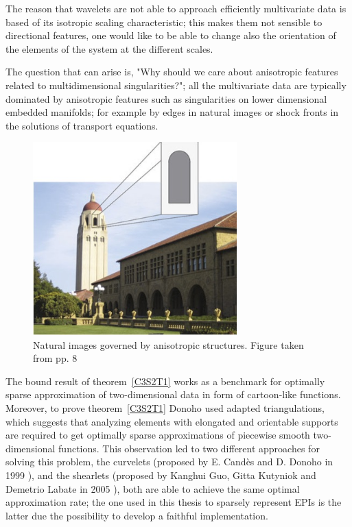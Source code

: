 \bigskip

The reason that wavelets are not able to approach efficiently multivariate data is based of its isotropic scaling characteristic; this makes them not sensible to directional features, one would like to be able to change also the orientation of the elements of the system at the different scales. 

\bigskip

The question that can arise is, "Why should we care about anisotropic features related to multidimensional singularities?"; all the multivariate data are typically dominated by anisotropic features such as singularities on lower dimensional embedded manifolds; for example by edges in natural images or shock fronts in the solutions of transport equations. 

\begin{figure}[h!]
\centering
\includegraphics[width = 0.7\textwidth]{./Diagrams/edges-images.jpg}
\caption{Natural images governed by anisotropic structures. Figure taken from \cite{IntroShearlets} pp. 8}
\label{edges-images}
\end{figure}

\bigskip

The bound result of theorem~\ref{C3S2T1} works as a benchmark for optimally sparse approximation of two-dimensional data in form of cartoon-like functions. Moreover, to prove theorem~\ref{C3S2T1} Donoho used adapted triangulations, which suggests that analyzing elements with elongated and orientable supports are required to get optimally sparse approximations of piecewise smooth two-dimensional functions. This observation led to two different approaches for solving this problem, the curvelets (proposed by E. Candès and D. Donoho in 1999 \cite{Curvelets}), and the shearlets (proposed by Kanghui Guo, Gitta Kutyniok and Demetrio Labate in 2005 \cite{FirstShearlets}), both are able to achieve the same optimal approximation rate; the one used in this thesis to sparsely represent EPIs is the latter due the possibility to develop a faithful implementation. 

